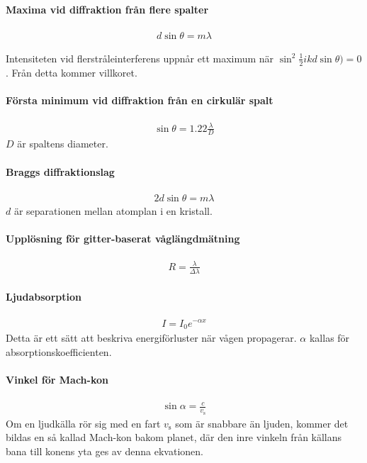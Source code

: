 \paragraph{Maxima vid diffraktion från flere spalter}
\begin{align*}
	d\sin{\theta} = m\lambda
\end{align*}

\deriv
Intensiteten vid flerstråleinterferens uppnår ett maximum när $\sin^2{\frac{1}{2}ikd\sin{\theta})} = 0$. Från detta kommer villkoret.

\paragraph{Första minimum vid diffraktion från en cirkulär spalt}
\begin{align*}
	\sin{\theta} = 1.22\frac{\lambda}{D}
\end{align*}
$D$ är spaltens diameter.

\paragraph{Braggs diffraktionslag}
\begin{align*}
	2d\sin{\theta} = m\lambda
\end{align*}
$d$ är separationen mellan atomplan i en kristall.

\deriv

\paragraph{Upplösning för gitter-baserat våglängdmätning}
\begin{align*}
	R = \frac{\lambda}{\Delta\lambda}
\end{align*}

\paragraph{Ljudabsorption}
\begin{align*}
	I = I_0e^{-\alpha x}
\end{align*}
Detta är ett sätt att beskriva energiförluster när vågen propagerar. $\alpha$ kallas för absorptionskoefficienten.

\paragraph{Vinkel för Mach-kon}
\begin{align*}
	\sin{\alpha} = \frac{c}{v_{\text{s}}}
\end{align*}
Om en ljudkälla rör sig med en fart $v_{\text{s}}$ som är snabbare än ljuden, kommer det bildas en så kallad Mach-kon bakom planet, där den inre vinkeln från källans bana till konens yta ges av denna ekvationen.

\deriv